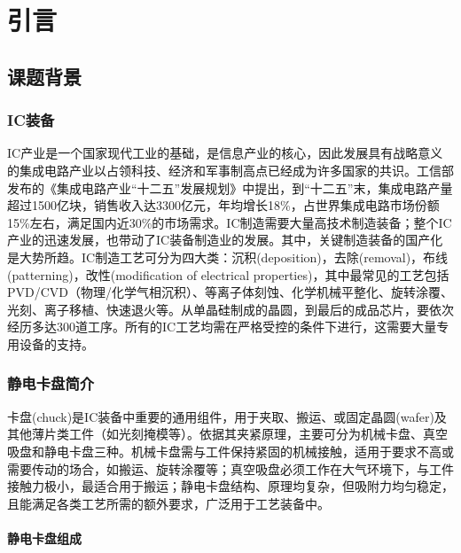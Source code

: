 \cleardoublepage
\chapter{引言}\label{ch:bg}



\section{课题背景}\label{sec:bg-bg}


\subsection{IC装备}\label{sec:bg-bg-ic}

IC产业是一个国家现代工业的基础，是信息产业的核心，因此发展具有战略意义的集成电路产业以占领科技、经济和军事制高点已经成为许多国家的共识。工信部发布的《集成电路产业“十二五”发展规划》中提出，到“十二五”末，集成电路产量超过1500亿块，销售收入达3300亿元，年均增长18\%，占世界集成电路市场份额15\%左右，满足国内近30\%的市场需求。IC制造需要大量高技术制造装备；整个IC产业的迅速发展，也带动了IC装备制造业的发展。其中，关键制造装备的国产化是大势所趋。IC制造工艺可分为四大类：沉积(deposition)，去除(removal)，布线(patterning)，改性(modification of electrical properties)，其中最常见的工艺包括PVD/CVD（物理/化学气相沉积）、等离子体刻蚀、化学机械平整化、旋转涂覆、光刻、离子移植、快速退火等。从单晶硅制成的晶圆，到最后的成品芯片，要依次经历多达300道工序。所有的IC工艺均需在严格受控的条件下进行，这需要大量专用设备的支持。


\subsection{静电卡盘简介}\label{sec:bg-bg-chuck}

卡盘(chuck)是IC装备中重要的通用组件，用于夹取、搬运、或固定晶圆(wafer)及其他薄片类工件（如光刻掩模等）。依据其夹紧原理，主要可分为机械卡盘、真空吸盘和静电卡盘三种。机械卡盘需与工件保持紧固的机械接触，适用于要求不高或需要传动的场合，如搬运、旋转涂覆等；真空吸盘必须工作在大气环境下，与工件接触力极小，最适合用于搬运；静电卡盘结构、原理均复杂，但吸附力均匀稳定，且能满足各类工艺所需的额外要求，广泛用于工艺装备中。

\subsubsection{静电卡盘组成}\label{sec:bg-bg-chuck-component}

